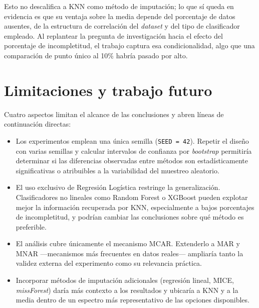 Esto no descalifica a KNN como método de imputación; lo que sí queda en
evidencia es que su ventaja sobre la media depende del porcentaje de
datos ausentes, de la estructura de correlación del \textit{dataset} y
del tipo de clasificador empleado. Al replantear la pregunta de
investigación hacia el efecto del porcentaje de incompletitud, el trabajo
captura esa condicionalidad, algo que una comparación de punto único al
10\% habría pasado por alto.

\section{Limitaciones y trabajo futuro}

Cuatro aspectos limitan el alcance de las conclusiones y abren líneas de
continuación directas:

\begin{itemize}
    \item Los experimentos emplean una única semilla (\texttt{SEED = 42}).
          Repetir el diseño con varias semillas y calcular intervalos de
          confianza por \textit{bootstrap} permitiría determinar si las
          diferencias observadas entre métodos son estadísticamente
          significativas o atribuibles a la variabilidad del muestreo
          aleatorio.

    \item El uso exclusivo de Regresión Logística restringe la
          generalización. Clasificadores no lineales como Random Forest
          o XGBoost pueden explotar mejor la información recuperada por
          KNN, especialmente a bajos porcentajes de incompletitud, y
          podrían cambiar las conclusiones sobre qué método es preferible.

    \item El análisis cubre únicamente el mecanismo MCAR. Extenderlo a
          MAR y MNAR —mecanismos más frecuentes en datos reales— ampliaría
          tanto la validez externa del experimento como su relevancia
          práctica.

    \item Incorporar métodos de imputación adicionales (regresión lineal,
          MICE, \textit{missForest}) daría más contexto a los resultados
          y ubicaría a KNN y a la media dentro de un espectro más
          representativo de las opciones disponibles.
\end{itemize}
